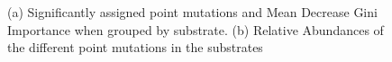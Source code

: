 \begin{figure}[h!]
    \centering
    \caption{(a) Significantly assigned point mutations and Mean Decrease Gini Importance when grouped by substrate. (b) Relative Abundances of the different point mutations in the substrates}
    \label{snps_substrate}
\end{figure}


